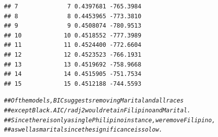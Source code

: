 \documentclass{article}\usepackage[]{graphicx}\usepackage[]{xcolor}
\makeatletter
\newcommand{\hlcom}[1]{\textcolor[rgb]{0.678,0.584,0.686}{\textit{#1}}}%
\newenvironment{kframe}{%
 \def\at@end@of@kframe{}%
 \ifinner\ifhmode%
  \def\at@end@of@kframe{\end{minipage}}%
  \begin{minipage}{\columnwidth}%
 \fi\fi%
 \def\FrameCommand##1{\hskip\@totalleftmargin \hskip-\fboxsep
 \colorbox{shadecolor}{##1}\hskip-\fboxsep
     \hskip-\linewidth \hskip-\@totalleftmargin \hskip\columnwidth}%
 \MakeFramed {\advance\hsize-\width
   \@totalleftmargin\z@ \linewidth\hsize
   \@setminipage}}%
 {\par\unskip\endMakeFramed%
 \at@end@of@kframe}
\newenvironment{knitrout}{}{} %
\makeatother
\begin{document}
\begin{knitrout}
\begin{kframe}
\begin{verbatim}
## 7              7 0.4397681 -765.3984
## 8              8 0.4453965 -773.3810
## 9              9 0.4508074 -780.9513
## 10            10 0.4518552 -777.3989
## 11            11 0.4524400 -772.6604
## 12            12 0.4523523 -766.1931
## 13            13 0.4519692 -758.9668
## 14            14 0.4515905 -751.7534
## 15            15 0.4512188 -744.5593
\end{verbatim}
\begin{alltt}
\hlcom{## Of the models, BIC suggests removing Marital and all races}
\hlcom{## except Black. AIC / radj2 would retain Filipino and Marital.}
\hlcom{## Since there is only a single Philipino instance, we remove Filipino,}
\hlcom{## as well as marital since the significance is so low.}
\end{alltt}
\end{kframe}
\end{knitrout}
\end{document}
